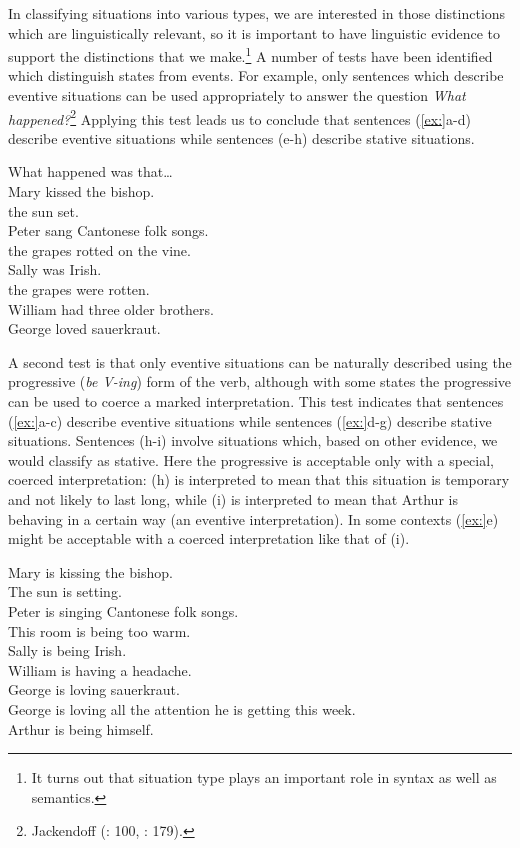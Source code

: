 In classifying situations into various types, we are interested in those distinctions which are linguistically relevant, so it is important to have linguistic evidence to support the distinctions that we make.\footnote{It turns out that situation type plays an important role in syntax as well as semantics.} A number of tests have been identified which distinguish states from events. For example, only sentences which describe eventive situations can be used appropriately to answer the question \textit{What happened?}\footnote{Jackendoff (\citeyear{Jackendoff1976}: 100, \citeyear{Jackendoff1983}: 179).} Applying this test leads us to conclude that sentences (\ref{ex:}a-d) describe eventive situations while sentences (e-h) describe stative situations.


\ea
What happened was that…\\
\ea Mary kissed the bishop.\\
\ex the sun set.\\
\ex Peter sang Cantonese folk songs.\\
\ex the grapes rotted on the vine.\\
\ex *Sally was Irish.\\
\ex *the grapes were rotten.\\
\ex *William had three older brothers.\\
\ex *George loved sauerkraut.
                       \z
\z


A second test is that only eventive situations can be naturally described using the progressive (\textit{be V-ing}) form of the verb, although with some states the progressive can be used to coerce a marked interpretation. This test indicates that sentences (\ref{ex:}a-c) describe eventive situations while sentences (\ref{ex:}d-g) describe stative situations. Sentences (h-i) involve situations which, based on other evidence, we would classify as stative. Here the progressive is acceptable only with a special, coerced interpretation: (h) is interpreted to mean that this situation is temporary and not likely to last long, while (i) is interpreted to mean that Arthur is behaving in a certain way (an eventive interpretation). In some contexts (\ref{ex:}e) might be acceptable with a coerced interpretation like that of (i).


\ea
\ea Mary is kissing the bishop.\\
\ex The sun is setting.\\
\ex Peter is singing Cantonese folk songs.\\
\ex *This room is being too warm.\\
\ex *Sally is being Irish.\\
\ex *William is having a headache.\\
\ex *George is loving sauerkraut.\\
\ex George is loving all the attention he is getting this week.\\
\ex Arthur is being himself.
                       \z
\z


